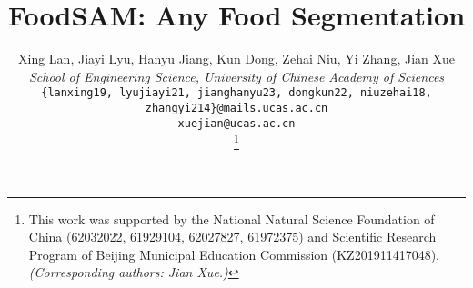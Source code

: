 \documentclass[lettersize,journal]{IEEEtran}
\begin{document}
\title{FoodSAM: Any Food Segmentation}
\author{Xing Lan, Jiayi Lyu, Hanyu Jiang, Kun Dong, Zehai Niu, Yi Zhang, Jian Xue

\textit{School of Engineering Science, University of Chinese Academy of Sciences}

{\tt \small \{lanxing19, lyujiayi21, jianghanyu23, dongkun22, niuzehai18, zhangyi214\}@mails.ucas.ac.cn}

{\tt \small xuejian@ucas.ac.cn}



\thanks{
This work was supported by the National Natural Science Foundation of China (62032022, 61929104, 62027827, 61972375) and Scientific Research Program of Beijing Municipal Education Commission (KZ201911417048).
\emph{(Corresponding authors: Jian Xue.)}}}



\end{document}
